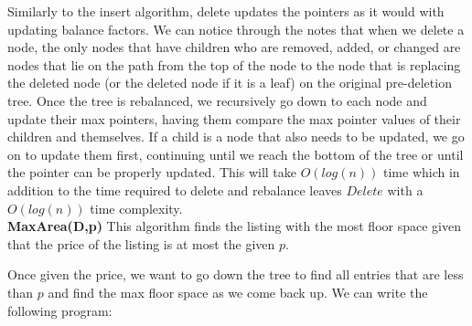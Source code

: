\documentclass[20pt]{article}
\begin{document}
\begin{text}
    \noindent
    Similarly to the insert algorithm, delete updates the pointers as it would with updating balance factors. We can notice through the notes that when we delete a node, the only nodes that have children who are removed, added, or changed are nodes that lie on the path from the top of the node to the node that is replacing the deleted node (or the deleted node if it is a leaf) on the original pre-deletion tree. Once the tree is rebalanced, we recursively go down to each node and update their max pointers, having them compare the max pointer values of their children and themselves. If a child is a node that also needs to be updated, we go on to update them first, continuing until we reach the bottom of the tree or until the pointer can be properly updated. This will take $O(log(n))$ time which in addition to the time required to delete and rebalance leaves $Delete$ with a $O(log(n))$ time complexity.\\
    
    \noindent
    \textbf{MaxArea(D,p)}
    This algorithm finds the listing with the most floor space given that the price of the listing is at most the given $p$.
    
    \noindent
    Once given the price, we want to go down the tree to find all entries that are less than $p$ and find the max floor space as we come back up. We can write the following program:
\end{text}
\end{document}
